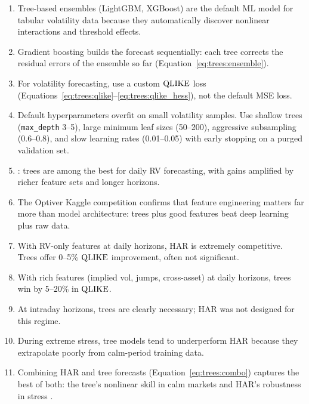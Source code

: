 \begin{enumerate}[leftmargin=1.8em]
\item Tree-based ensembles (LightGBM, XGBoost) are the default ML model for
  tabular volatility data because they automatically discover nonlinear
  interactions and threshold effects.

\item Gradient boosting builds the forecast sequentially: each tree corrects
  the residual errors of the ensemble so far (Equation~\ref{eq:trees:ensemble}).

\item For volatility forecasting, use a custom $\operatorname{QLIKE}$ loss
  (Equations~\ref{eq:trees:qlike}--\ref{eq:trees:qlike_hess}), not the
  default MSE loss.

\item Default hyperparameters overfit on small volatility samples.  Use
  shallow trees (\texttt{max\_depth} 3--5), large minimum leaf sizes
  (50--200), aggressive subsampling (0.6--0.8), and slow learning rates
  (0.01--0.05) with early stopping on a purged validation set.

\item \citet{ChristensenSiggaardVeliyev2023}: trees are among the best for
  daily RV forecasting, with gains amplified by richer feature sets and
  longer horizons.

\item The Optiver Kaggle competition confirms that feature engineering
  matters far more than model architecture: trees plus good features beat
  deep learning plus raw data.

\item With RV-only features at daily horizons, HAR is extremely competitive.
  Trees offer 0--5\% $\operatorname{QLIKE}$ improvement, often not significant.

\item With rich features (implied vol, jumps, cross-asset) at daily
  horizons, trees win by 5--20\% in $\operatorname{QLIKE}$.

\item At intraday horizons, trees are clearly necessary; HAR was not
  designed for this regime.

\item During extreme stress, tree models tend to underperform HAR because
  they extrapolate poorly from calm-period training data.

\item Combining HAR and tree forecasts (Equation~\ref{eq:trees:combo})
  captures the best of both: the tree's nonlinear skill in calm markets
  and HAR's robustness in stress \citep{RahimikiaPoon2020}.


\end{enumerate}
